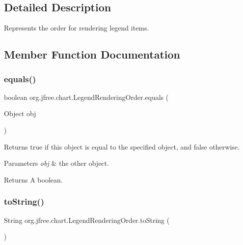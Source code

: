 \subsection{Detailed Description}
Represents the order for rendering legend items. 

\subsection{Member Function Documentation}
\mbox{\label{classorg_1_1jfree_1_1chart_1_1_legend_rendering_order_aba2edfd66e02030760e46bc259af86d0}} 
\subsubsection{\texorpdfstring{equals()}{equals()}}
{\footnotesize\ttfamily boolean org.\+jfree.\+chart.\+Legend\+Rendering\+Order.\+equals (\begin{DoxyParamCaption}\item[{Object}]{obj }\end{DoxyParamCaption})}

Returns {\ttfamily true} if this object is equal to the specified object, and {\ttfamily false} otherwise.


\begin{DoxyParams}{Parameters}
{\em obj} & the other object.\\
\hline
\end{DoxyParams}
\begin{DoxyReturn}{Returns}
A boolean. 
\end{DoxyReturn}
\mbox{\label{classorg_1_1jfree_1_1chart_1_1_legend_rendering_order_a68ae725fd53deff6ae4216abcd617b65}} 
\subsubsection{\texorpdfstring{to\+String()}{toString()}}
{\footnotesize\ttfamily String org.\+jfree.\+chart.\+Legend\+Rendering\+Order.\+to\+String (\begin{DoxyParamCaption}{ }\end{DoxyParamCaption})}


